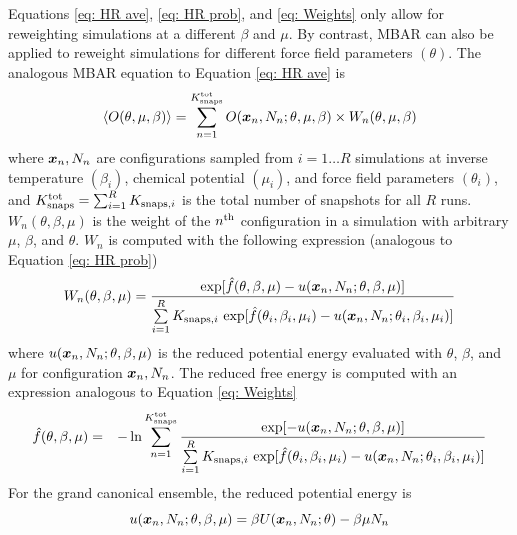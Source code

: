 \documentclass[journal=jced,manuscript=article]{achemso}
\newcommand{\bfv}[1]{{\mbox{\boldmath{$#1$}}}}
\newcommand{\x}{\bfv{x}}
\begin{document}
Equations \ref{eq: HR ave}, \ref{eq: HR prob}, and \ref{eq: Weights} only allow for reweighting simulations at a different $\beta$ and $\mu$. By contrast, MBAR can also be applied to reweight simulations for different force field parameters $(\theta)$. The analogous MBAR equation to Equation \ref{eq: HR ave} is
\begin{eqnarray} \label{eq: MBAR ave}
\langle O(\theta,\mu,\beta)\rangle = \sum_{n=1}^{K^{\rm tot}_{\rm snaps}} O(\x_{n},N_n;\theta,\mu,\beta) \times W_{n}(\theta,\mu,\beta)
\end{eqnarray}
where $\x_n,N_n$ are configurations sampled from $i=1 \ldots R$ simulations at inverse temperature $(\beta_{i})$, chemical potential $(\mu_{i})$, and force field parameters $(\theta_i)$, and $K^{\rm tot}_{\rm snaps} = \sum_{i=1}^R K_{\mathrm{snaps}, i}$ is the total number of snapshots for all $R$ runs. $W_{n}(\theta,\beta,\mu)$ is the weight of the $n^{\rm th}$ configuration in a simulation with arbitrary $\mu$, $\beta$, and $\theta$. $W_{n}$ is computed with the following expression (analogous to Equation \ref{eq: HR prob})
\begin{eqnarray} \label{eq: MBAR weights}
W_{n}(\theta,\beta,\mu) = \frac{\exp[\hat{f}(\theta,\beta,\mu)-u(\x_{n},N_n;\theta,\beta,\mu)]}{\sum\limits_{i=1}^R K_{\mathrm{snaps}, i} \, \exp[\hat{f}(\theta_i,\beta_{i},\mu_{i}) - u(\x_{n},N_n;\theta_i,\beta_{i},\mu_{i})]}
\end{eqnarray}
where $u(\x_{n},N_n;\theta,\beta,\mu)$ is the reduced potential energy evaluated with $\theta$, $\beta$, and $\mu$ for configuration $\x_n,N_n$. The reduced free energy is computed with an expression analogous to Equation \ref{eq: Weights}
\begin{eqnarray} \label{eq: MBAR free energy}
\hat f(\theta,\beta,\mu) &=& - \ln \sum_{n=1}^{K^{\rm tot}_{\rm snaps}}
\frac{\exp[-u(\x_{n},N_n;\theta,\beta,\mu)]}{\sum\limits_{i=1}^R K_{\mathrm{snaps}, i} \, \exp[\hat{f}(\theta_i,\beta_{i},\mu_{i}) - u(\x_{n},N_n;\theta_i,\beta_{i},\mu_{i})]}
\end{eqnarray}
For the grand canonical ensemble, the reduced potential energy is
\begin{equation} \label{eq: reduced potential}
u(\x_{n},N_n;\theta,\beta,\mu) = \beta U(\x_n,N_n;\theta) - \beta \mu N_n
\end{equation} 
\end{document}
